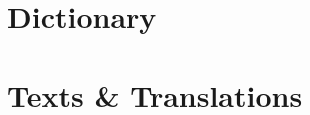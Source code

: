 \documentclass[a4paper,11pt,oneside,openany]{memoir}
\begin{document}





\part{Dictionary}



\part{Texts \& Translations}

\end{document}
